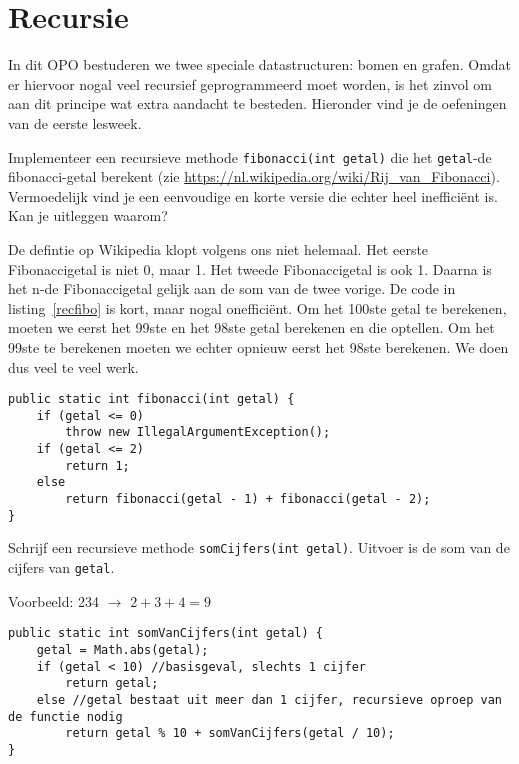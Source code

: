 \chapter{Recursie}
In dit OPO bestuderen we twee speciale datastructuren: bomen en grafen. Omdat er hiervoor nogal veel recursief geprogrammeerd moet worden, is het zinvol om aan dit principe wat extra aandacht te besteden. Hieronder vind je de oefeningen van de eerste lesweek.
\begin{oef}
\code Implementeer een recursieve methode \verb/fibonacci(int getal)/ die het \verb/getal/-de fibonacci-getal berekent (zie \url{https://nl.wikipedia.org/wiki/Rij_van_Fibonacci}). Vermoedelijk vind je een eenvoudige en korte versie die echter heel inefficiënt is. Kan je uitleggen waarom? 
\begin{opl}
De defintie op Wikipedia klopt volgens ons niet helemaal. Het eerste Fibonaccigetal is niet 0, maar 1. Het tweede Fibonaccigetal is ook 1. Daarna is het n-de Fibonaccigetal gelijk aan de som van de twee vorige. De code in listing~\ref{recfibo} is kort, maar nogal onefficiënt. Om het 100ste getal te berekenen, moeten we eerst het 99ste en het 98ste getal berekenen en die optellen. Om het 99ste te berekenen moeten we echter opnieuw eerst het 98ste berekenen. We doen dus veel te veel werk.
\begin{lstlisting}[caption={Recursieve methode om Fibonacci-getallen te berekenen}, label=recfibo]
public static int fibonacci(int getal) {
	if (getal <= 0)
		throw new IllegalArgumentException();
	if (getal <= 2)
		return 1;  
	else
		return fibonacci(getal - 1) + fibonacci(getal - 2);
}
\end{lstlisting}
\end{opl}

\end{oef}

\begin{oef}
\code Schrijf een recursieve methode \verb/somCijfers(int getal)/. Uitvoer is de som van de cijfers van \verb/getal/. 

Voorbeeld: 234 $\rightarrow$ $2+3+4=9$
\begin{opl}
\begin{lstlisting}[caption={Recursieve methode om de som van de cijfers van een getal te berekenen}, label=recsomgetallen]
public static int somVanCijfers(int getal) {
	getal = Math.abs(getal);
	if (getal < 10) //basisgeval, slechts 1 cijfer
		return getal;
	else //getal bestaat uit meer dan 1 cijfer, recursieve oproep van de functie nodig
		return getal % 10 + somVanCijfers(getal / 10);
}
\end{lstlisting}
\end{opl}

\end{oef}




